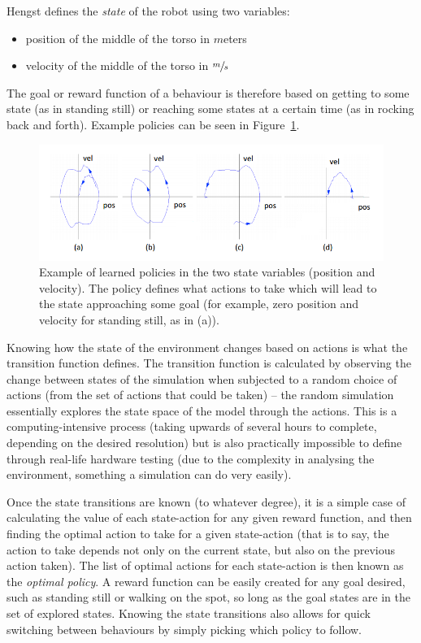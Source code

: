 Hengst defines the \textit{state} of the robot using two variables:
\begin{itemize}
\item position of the middle of the torso in $m$eters
\item velocity of the middle of the torso in $\sfrac{m}{s}$
\end{itemize}

The goal or reward function of a behaviour is therefore based on getting to some state (as in standing still) or reaching some states at a certain time (as in rocking back and forth). Example policies can be seen in Figure~\ref{fig:policy_diagram}.

\begin{figure}[!h]
\centering
\includegraphics[width=5in]{img/RL_policies.png}
\caption{Example of learned policies in the two state variables (position and velocity). The policy defines what actions to take which will lead to the state approaching some goal (for example, zero position and velocity for standing still, as in (a)).\cite{bernhard_rl}}
\label{fig:policy_diagram}
\end{figure}

Knowing how the state of the environment changes based on actions is what the transition function defines. The transition function is calculated by observing the change between states of the simulation when subjected to a random choice of actions (from the set of actions that could be taken) -- the random simulation essentially explores the state space of the model through the actions. This is a computing-intensive process (taking upwards of several hours to complete, depending on the desired resolution) but is also practically impossible to define through real-life hardware testing (due to the complexity in analysing the environment, something a simulation can do very easily).

Once the state transitions are known (to whatever degree), it is a simple case of calculating the value of each state-action for any given reward function, and then finding the optimal action to take for a given state-action (that is to say, the action to take depends not only on the current state, but also on the previous action taken). The list of optimal actions for each state-action is then known as the \textit{optimal policy}. A reward function can be easily created for any goal desired, such as standing still or walking on the spot, so long as the goal states are in the set of explored states. Knowing the state transitions also allows for quick switching between behaviours by simply picking which policy to follow.

